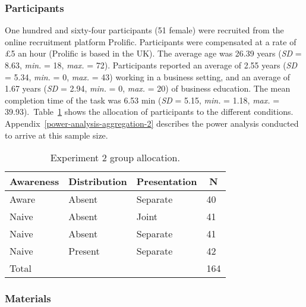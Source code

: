 \documentclass[
  english,
  man, donotrepeattitle,floatsintext]{apa7}
\theoremstyle{definition}
\theoremstyle{definition}
\theoremstyle{definition}
\theoremstyle{definition}
\theoremstyle{remark}
\begin{document}
\hypertarget{participants-1}{%
\subsubsection{Participants}\label{participants-1}}

One hundred and sixty-four participants (51 female) were recruited from the online recruitment platform Prolific. Participants were compensated at a rate of \pounds 5 an hour (Prolific is based in the UK). The average age was 26.39 years (\emph{SD} = 8.63, \emph{min.} = 18, \emph{max.} = 72). Participants reported an average of 2.55 years (\emph{SD} = 5.34, \emph{min.} = 0, \emph{max.} = 43) working in a business setting, and an average of 1.67 years (\emph{SD} = 2.94, \emph{min.} = 0, \emph{max.} = 20) of business education. The mean completion time of the task was 6.53 min (\emph{SD} = 5.15, \emph{min.} = 1.18, \emph{max.} = 39.93).~Table~\ref{tab:condition-allocation-aggregation-2}
shows the allocation of participants to the different conditions.
Appendix~\ref{power-analysis-aggregation-2} describes the power analysis
conducted to arrive at this sample size.

\begin{table}[tbp]

\begin{center}
\begin{threeparttable}

\caption{\label{tab:condition-allocation-aggregation-2}Experiment 2 group allocation.}

\begin{tabular}{llll}
\toprule
Awareness & \multicolumn{1}{c}{Distribution} & \multicolumn{1}{c}{Presentation} & \multicolumn{1}{c}{N}\\
\midrule
Aware & Absent & Separate & 40\\
Naive & Absent & Joint & 41\\
Naive & Absent & Separate & 41\\
Naive & Present & Separate & 42\\
Total &  &  & 164\\
\bottomrule
\end{tabular}

\end{threeparttable}
\end{center}

\end{table}

\hypertarget{materials-1}{%
\subsubsection{Materials}\label{materials-1}}
\end{document}
